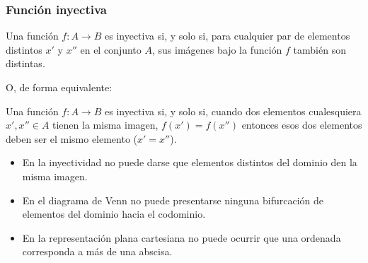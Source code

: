 \subsubsection{Función inyectiva}
\vspace{1em} 
\begin{fmd-definition}
	Una función $f: A \rightarrow B$ es inyectiva si, y solo si, para cualquier par de elementos distintos $x'$ y $x''$ en el conjunto $A$, sus imágenes bajo la función $f$ también son distintas.
\end{fmd-definition}
\vspace{1mm}

O, de forma equivalente:

Una función $f: A \rightarrow B$ es inyectiva si, y solo si, cuando dos elementos cualesquiera $x', x'' \in A$ tienen la misma imagen, $f(x') = f(x'')$ entonces esos dos elementos deben ser el mismo elemento ($x' = x''$).

\begin{itemize}
	\item En la inyectividad no puede darse que elementos distintos del dominio den la misma
	imagen.
	\item En el diagrama de Venn no puede presentarse ninguna bifurcación de elementos del 
	dominio hacia el codominio.
	\item En la representación plana cartesiana no puede ocurrir que una ordenada
	corresponda a más de una abscisa.
\end{itemize}

